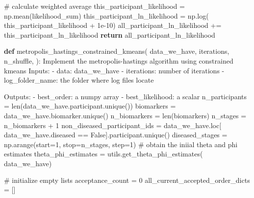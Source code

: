 \documentclass[
  letterpaper,
  DIV=11,
  numbers=noendperiod]{scrreprt}
\newenvironment{Shaded}{\begin{snugshade}}{\end{snugshade}}
\newcommand{\BuiltInTok}[1]{\textcolor[rgb]{0.00,0.23,0.31}{#1}}
\newcommand{\CommentTok}[1]{\textcolor[rgb]{0.37,0.37,0.37}{#1}}
\newcommand{\ControlFlowTok}[1]{\textcolor[rgb]{0.00,0.23,0.31}{\textbf{#1}}}
\newcommand{\DecValTok}[1]{\textcolor[rgb]{0.68,0.00,0.00}{#1}}
\newcommand{\FloatTok}[1]{\textcolor[rgb]{0.68,0.00,0.00}{#1}}
\newcommand{\KeywordTok}[1]{\textcolor[rgb]{0.00,0.23,0.31}{\textbf{#1}}}
\newcommand{\NormalTok}[1]{\textcolor[rgb]{0.00,0.23,0.31}{#1}}
\newcommand{\OperatorTok}[1]{\textcolor[rgb]{0.37,0.37,0.37}{#1}}
\newcommand{\VariableTok}[1]{\textcolor[rgb]{0.07,0.07,0.07}{#1}}
\begin{document}
\begin{Shaded}
\begin{Highlighting}[]
            \CommentTok{\# calculate weighted average}
\NormalTok{            this\_participant\_likelihood }\OperatorTok{=}\NormalTok{ np.mean(likelihood\_sum)}
\NormalTok{            this\_participant\_ln\_likelihood }\OperatorTok{=}\NormalTok{ np.log(}
\NormalTok{                this\_participant\_likelihood }\OperatorTok{+} \FloatTok{1e{-}10}\NormalTok{)}
\NormalTok{        all\_participant\_ln\_likelihood }\OperatorTok{+=}\NormalTok{ this\_participant\_ln\_likelihood}
    \ControlFlowTok{return}\NormalTok{ all\_participant\_ln\_likelihood}

\KeywordTok{def}\NormalTok{ metropolis\_hastings\_constrained\_kmeans(}
\NormalTok{    data\_we\_have,}
\NormalTok{    iterations,}
\NormalTok{    n\_shuffle,}
\NormalTok{):}
    \CommentTok{\textquotesingle{}\textquotesingle{}\textquotesingle{}Implement the metropolis{-}hastings algorithm using constrained kmeans}
\CommentTok{    Inputs: }
\CommentTok{        {-} data: data\_we\_have}
\CommentTok{        {-} iterations: number of iterations}
\CommentTok{        {-} log\_folder\_name: the folder where log files locate}

\CommentTok{    Outputs:}
\CommentTok{        {-} best\_order: a numpy array}
\CommentTok{        {-} best\_likelihood: a scalar }
\CommentTok{    \textquotesingle{}\textquotesingle{}\textquotesingle{}}
\NormalTok{    n\_participants }\OperatorTok{=} \BuiltInTok{len}\NormalTok{(data\_we\_have.participant.unique())}
\NormalTok{    biomarkers }\OperatorTok{=}\NormalTok{ data\_we\_have.biomarker.unique()}
\NormalTok{    n\_biomarkers }\OperatorTok{=} \BuiltInTok{len}\NormalTok{(biomarkers)}
\NormalTok{    n\_stages }\OperatorTok{=}\NormalTok{ n\_biomarkers }\OperatorTok{+} \DecValTok{1}
\NormalTok{    non\_diseased\_participant\_ids }\OperatorTok{=}\NormalTok{ data\_we\_have.loc[}
\NormalTok{        data\_we\_have.diseased }\OperatorTok{==} \VariableTok{False}\NormalTok{].participant.unique()}
\NormalTok{    diseased\_stages }\OperatorTok{=}\NormalTok{ np.arange(start}\OperatorTok{=}\DecValTok{1}\NormalTok{, stop}\OperatorTok{=}\NormalTok{n\_stages, step}\OperatorTok{=}\DecValTok{1}\NormalTok{)}
    \CommentTok{\# obtain the iniial theta and phi estimates}
\NormalTok{    theta\_phi\_estimates }\OperatorTok{=}\NormalTok{ utils.get\_theta\_phi\_estimates(}
\NormalTok{        data\_we\_have)}

    \CommentTok{\# initialize empty lists}
\NormalTok{    acceptance\_count }\OperatorTok{=} \DecValTok{0}
\NormalTok{    all\_current\_accepted\_order\_dicts }\OperatorTok{=}\NormalTok{ []}


\end{Highlighting}
\end{Shaded}
\end{document}
